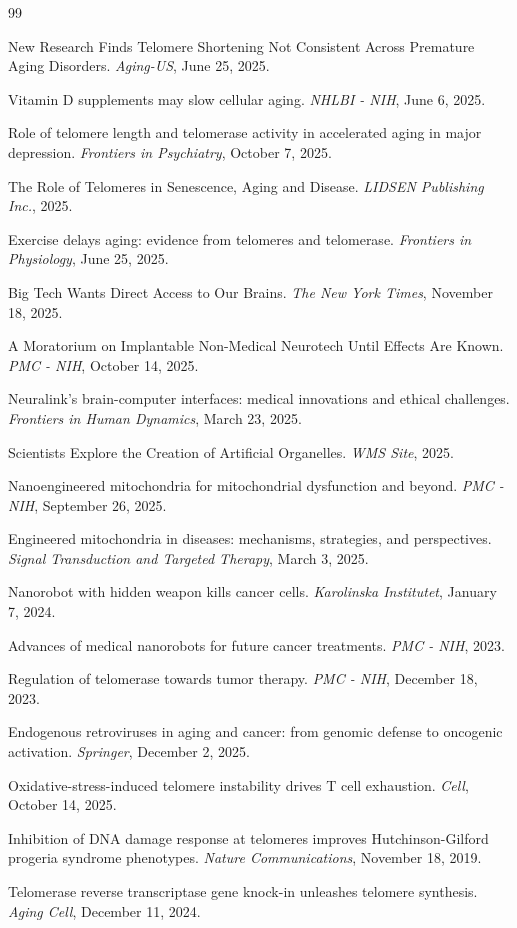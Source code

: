 \documentclass[reprint, amsmath, amssymb, aps, prd]{revtex4-2}
\begin{document}
\begin{thebibliography}{99}

 New Research Finds Telomere Shortening Not Consistent Across Premature Aging Disorders. \textit{Aging-US}, June 25, 2025.

 Vitamin D supplements may slow cellular aging. \textit{NHLBI - NIH}, June 6, 2025.

 Role of telomere length and telomerase activity in accelerated aging in major depression. \textit{Frontiers in Psychiatry}, October 7, 2025.

 The Role of Telomeres in Senescence, Aging and Disease. \textit{LIDSEN Publishing Inc.}, 2025.

 Exercise delays aging: evidence from telomeres and telomerase. \textit{Frontiers in Physiology}, June 25, 2025.

 Big Tech Wants Direct Access to Our Brains. \textit{The New York Times}, November 18, 2025.

 A Moratorium on Implantable Non-Medical Neurotech Until Effects Are Known. \textit{PMC - NIH}, October 14, 2025.

 Neuralink's brain-computer interfaces: medical innovations and ethical challenges. \textit{Frontiers in Human Dynamics}, March 23, 2025.

 Scientists Explore the Creation of Artificial Organelles. \textit{WMS Site}, 2025.

 Nanoengineered mitochondria for mitochondrial dysfunction and beyond. \textit{PMC - NIH}, September 26, 2025.

 Engineered mitochondria in diseases: mechanisms, strategies, and perspectives. \textit{Signal Transduction and Targeted Therapy}, March 3, 2025.

 Nanorobot with hidden weapon kills cancer cells. \textit{Karolinska Institutet}, January 7, 2024.

 Advances of medical nanorobots for future cancer treatments. \textit{PMC - NIH}, 2023.

 Regulation of telomerase towards tumor therapy. \textit{PMC - NIH}, December 18, 2023.

 Endogenous retroviruses in aging and cancer: from genomic defense to oncogenic activation. \textit{Springer}, December 2, 2025.

 Oxidative-stress-induced telomere instability drives T cell exhaustion. \textit{Cell}, October 14, 2025.

 Inhibition of DNA damage response at telomeres improves Hutchinson-Gilford progeria syndrome phenotypes. \textit{Nature Communications}, November 18, 2019.

 Telomerase reverse transcriptase gene knock-in unleashes telomere synthesis. \textit{Aging Cell}, December 11, 2024.

\end{thebibliography}
\end{document}
